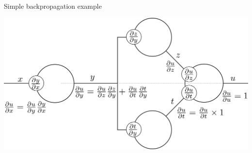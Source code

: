 \documentclass[xcolor=pdftex,dvipsnames,table,mathserif]{beamer}
\begin{document}



\begin{frame}{Simple backpropagation example}

\includegraphics[width=\textwidth]{../graphics/bp.png}

\end{frame}



\end{document}
